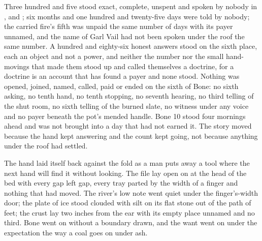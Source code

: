 Three hundred and five stood exact, complete, unspent and spoken by nobody in ,  and ; six months and one hundred and twenty-five days were told by nobody; the carried fire's fifth was unpaid the same number of days with its payer unnamed, and the name of Garl Vail had not been spoken under the roof the same number. A hundred and eighty-six honest answers stood on the sixth place, each an object and not a power, and neither the number nor the small hand-movings that made them stood up and called themselves a doctrine, for a doctrine is an account that has found a payer and none stood. Nothing was opened, joined, named, called, paid or ended on the sixth of Bone: no sixth asking, no tenth hand, no tenth stopping, no seventh hearing, no third telling of the shut room, no sixth telling of the burned slate, no witness under any voice and no payer beneath the pot's mended handle. Bone 10 stood four mornings ahead and was not brought into a day that had not earned it. The story moved because the hand kept answering and the count kept going, not because anything under the roof had settled.

The hand laid itself back against the fold as a man puts away a tool where the next hand will find it without looking. The file lay open on  at the head of the bed with every gap left gap, every tray parted by the width of a finger and nothing that had moved. The river's low note went quiet under the finger's-width door; the plate of ice stood clouded with silt on its flat stone out of the path of feet; the crust lay two inches from the ear with its empty place unnamed and no third. Bone went on without a boundary drawn, and the want went on under the expectation the way a coal goes on under ash.
